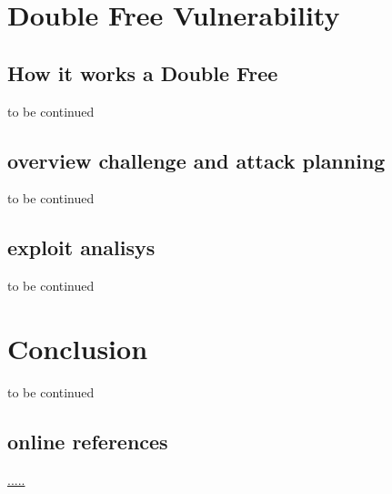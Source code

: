 \documentclass{report}
\begin{document}
    \chapter{Double Free Vulnerability}
    \section{How it works a Double Free}
    to be continued    
    \clearpage
    \section{overview challenge and attack planning}
    to be continued
    \clearpage
    \section{exploit analisys}
    to be continued
    \clearpage
    \chapter{Conclusion}
    to be continued
    \section{online references}
    \href{https://it.wikipedia.org/wiki/Home_page}{.....}
    \clearpage
\end{document}
